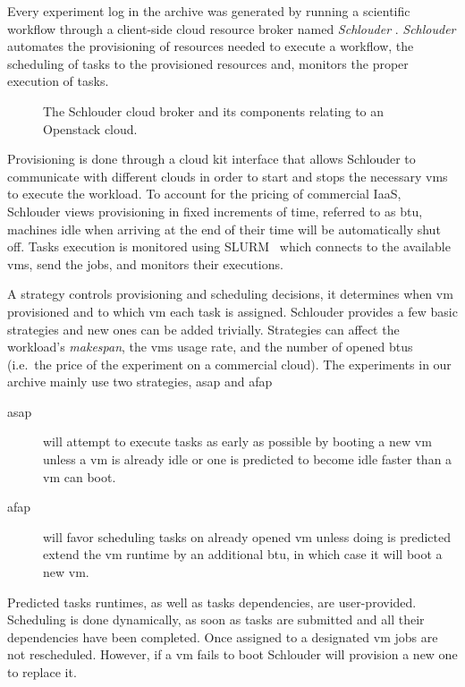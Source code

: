 Every  experiment log  in  the archive  was generated  by  running a  scientific
workflow  through a  client-side  cloud resource  broker named  \emph{Schlouder}
\cite{Michon17}. \emph{Schlouder} automates the provisioning of resources needed
to execute a workflow, the scheduling of tasks to the provisioned resources and,
monitors the proper execution of tasks.
%
\begin{figure}
	\centering
	
	\caption{The Schlouder cloud broker and its components relating to an
	Openstack cloud.}
\end{figure}
%
Provisioning is  done through  a cloud  kit interface  that allows  Schlouder to
communicate with  different clouds  in order  to start  and stops  the necessary
\acp{vm} to  execute the  workload.  To  account for  the pricing  of commercial
IaaS, Schlouder views  provisioning in fixed increments of time,  referred to as
\ac{btu},  machines  idle  when arriving  at  the  end  of  their time  will  be
automatically shut off.
%
Tasks execution  is monitored using  SLURM~\cite{YooJG03} which connects  to the
available \acp{vm}, send the jobs, and monitors their executions.

A strategy controls provisioning and scheduling decisions, it determines when
\ac{vm} provisioned and to which \ac{vm} each task is assigned. Schlouder
provides a few basic strategies and new ones can be added trivially. Strategies
can affect the workload's \emph{makespan}, the \acp{vm} usage rate, and the
number of opened \acp{btu} (i.e.\ the price of the experiment on a commercial
cloud). The experiments in our archive mainly use two strategies, \ac{asap} and
\ac{afap}

\begin{description}
	\item[\ac{asap}] will attempt to execute tasks as early as possible by
		booting a new \ac{vm} unless a \ac{vm} is already idle or one is
		predicted to become idle faster than a \ac{vm} can boot.
	\item[\ac{afap}] will favor scheduling tasks on already opened \ac{vm}
		unless doing is predicted extend the \ac{vm} runtime by an
		additional \ac{btu}, in which case it will boot a new \ac{vm}.
\end{description}

Predicted  tasks runtimes,  as well  as tasks  dependencies, are  user-provided.
Scheduling is  done dynamically, as  soon as tasks  are submitted and  all their
dependencies have been completed. Once assigned to a designated \ac{vm} jobs are
not rescheduled. However, if a \ac{vm}  fails to boot Schlouder will provision a
new one to replace it.

